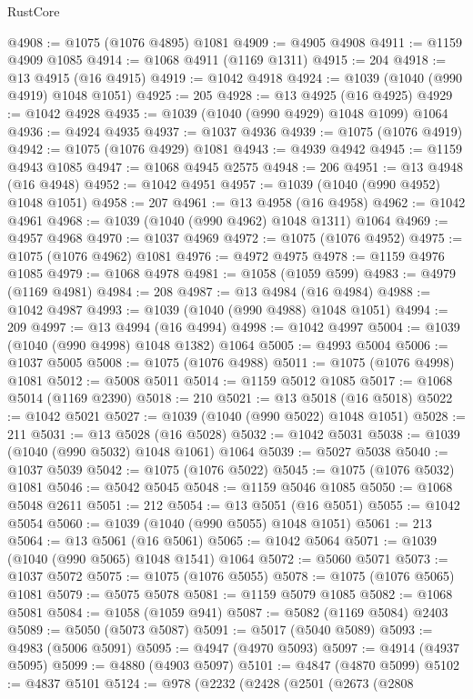 \begin{lexlean}{RustCore}
\begin{coremodule}
@4908 := @1075 (@1076 @4895) @1081
@4909 := @4905 @4908
@4911 := @1159 @4909 @1085
@4914 := @1068 @4911 (@1169 @1311)
@4915 := 204
@4918 := @13 @4915 (@16 @4915)
@4919 := @1042 @4918
@4924 := @1039 (@1040 (@990 @4919) @1048 @1051)
@4925 := 205
@4928 := @13 @4925 (@16 @4925)
@4929 := @1042 @4928
@4935 := @1039 (@1040 (@990 @4929) @1048 @1099) @1064
@4936 := @4924 @4935
@4937 := @1037 @4936
@4939 := @1075 (@1076 @4919)
@4942 := @1075 (@1076 @4929) @1081
@4943 := @4939 @4942
@4945 := @1159 @4943 @1085
@4947 := @1068 @4945 @2575
@4948 := 206
@4951 := @13 @4948 (@16 @4948)
@4952 := @1042 @4951
@4957 := @1039 (@1040 (@990 @4952) @1048 @1051)
@4958 := 207
@4961 := @13 @4958 (@16 @4958)
@4962 := @1042 @4961
@4968 := @1039 (@1040 (@990 @4962) @1048 @1311) @1064
@4969 := @4957 @4968
@4970 := @1037 @4969
@4972 := @1075 (@1076 @4952)
@4975 := @1075 (@1076 @4962) @1081
@4976 := @4972 @4975
@4978 := @1159 @4976 @1085
@4979 := @1068 @4978
@4981 := @1058 (@1059 @599)
@4983 := @4979 (@1169 @4981)
@4984 := 208
@4987 := @13 @4984 (@16 @4984)
@4988 := @1042 @4987
@4993 := @1039 (@1040 (@990 @4988) @1048 @1051)
@4994 := 209
@4997 := @13 @4994 (@16 @4994)
@4998 := @1042 @4997
@5004 := @1039 (@1040 (@990 @4998) @1048 @1382) @1064
@5005 := @4993 @5004
@5006 := @1037 @5005
@5008 := @1075 (@1076 @4988)
@5011 := @1075 (@1076 @4998) @1081
@5012 := @5008 @5011
@5014 := @1159 @5012 @1085
@5017 := @1068 @5014 (@1169 @2390)
@5018 := 210
@5021 := @13 @5018 (@16 @5018)
@5022 := @1042 @5021
@5027 := @1039 (@1040 (@990 @5022) @1048 @1051)
@5028 := 211
@5031 := @13 @5028 (@16 @5028)
@5032 := @1042 @5031
@5038 := @1039 (@1040 (@990 @5032) @1048 @1061) @1064
@5039 := @5027 @5038
@5040 := @1037 @5039
@5042 := @1075 (@1076 @5022)
@5045 := @1075 (@1076 @5032) @1081
@5046 := @5042 @5045
@5048 := @1159 @5046 @1085
@5050 := @1068 @5048 @2611
@5051 := 212
@5054 := @13 @5051 (@16 @5051)
@5055 := @1042 @5054
@5060 := @1039 (@1040 (@990 @5055) @1048 @1051)
@5061 := 213
@5064 := @13 @5061 (@16 @5061)
@5065 := @1042 @5064
@5071 := @1039 (@1040 (@990 @5065) @1048 @1541) @1064
@5072 := @5060 @5071
@5073 := @1037 @5072
@5075 := @1075 (@1076 @5055)
@5078 := @1075 (@1076 @5065) @1081
@5079 := @5075 @5078
@5081 := @1159 @5079 @1085
@5082 := @1068 @5081
@5084 := @1058 (@1059 @941)
@5087 := @5082 (@1169 @5084) @2403
@5089 := @5050 (@5073 @5087)
@5091 := @5017 (@5040 @5089)
@5093 := @4983 (@5006 @5091)
@5095 := @4947 (@4970 @5093)
@5097 := @4914 (@4937 @5095)
@5099 := @4880 (@4903 @5097)
@5101 := @4847 (@4870 @5099)
@5102 := @4837 @5101
@5124 := @978
    (@2232
      (@2428
        (@2501
          (@2673
            (@2808

\end{coremodule}
\end{lexlean}
